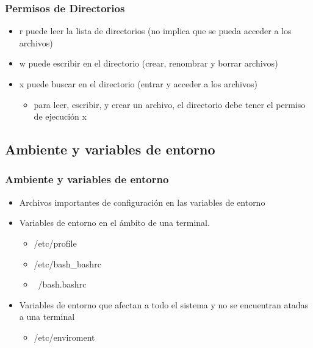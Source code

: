 \documentclass{beamer}
\begin{document}
\begin{frame}
\frametitle{Permisos de Directorios}
\begin{itemize}
\item r puede leer la lista de directorios (no implica que se pueda acceder a los archivos)
\item w puede escribir en el directorio (crear, renombrar y borrar archivos)
\item x puede buscar en el directorio (entrar y acceder a los archivos)
	\begin{itemize}
	\item para leer, escribir, y crear un archivo, el directorio debe tener el permiso de ejecuci\'on x
	\end{itemize}
\end{itemize}
\end{frame}
\subsection{Ambiente y variables de entorno}
\begin{frame}
	\frametitle{Ambiente y variables de entorno}
	\begin{itemize}
		\item Archivos importantes de configuraci\'on en las variables de entorno
		\item Variables de entorno en el ámbito de una terminal.
			\begin{itemize}
			\item /etc/profile
			\item /etc/bash\_bashrc
			\item ~/bash.bashrc
			\end{itemize}
		\item Variables de entorno que afectan a todo el sistema y no se encuentran atadas a una terminal
			\begin{itemize}
			\item /etc/enviroment
			\end{itemize}
	\end{itemize}
\end{frame} 
\end{document}
